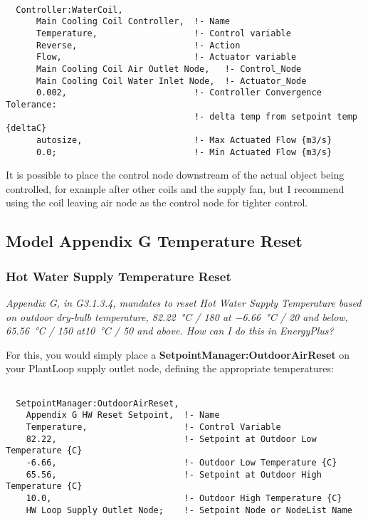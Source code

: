 \begin{lstlisting}

  Controller:WaterCoil,
      Main Cooling Coil Controller,  !- Name
      Temperature,                   !- Control variable
      Reverse,                       !- Action
      Flow,                          !- Actuator variable
      Main Cooling Coil Air Outlet Node,   !- Control_Node
      Main Cooling Coil Water Inlet Node,  !- Actuator_Node
      0.002,                         !- Controller Convergence Tolerance:
                                     !- delta temp from setpoint temp {deltaC}
      autosize,                      !- Max Actuated Flow {m3/s}
      0.0;                           !- Min Actuated Flow {m3/s}
\end{lstlisting}

It is possible to place the control node downstream of the actual object being controlled, for example after other coils and the supply fan, but I recommend using the coil leaving air node as the control node for tighter control.



\subsection{Model Appendix G Temperature Reset}%
\label{sub:model_appendix_g_temperature_reset}

\subsubsection{Hot Water Supply Temperature Reset}%
\label{ssub:hot_water_supply_temperature_reset}

\emph{Appendix G, in G3.1.3.4, mandates to reset Hot Water Supply Temperature based on outdoor dry-bulb temperature, \SI{82.22}{\celsius} / \SI{180}{\farenheit} at \SI{-6.66}{\celsius} / \SI{20}{\farenheit} and below, \SI{65.56}{\celsius} / \SI{150}{\farenheit} at\SI{10}{\celsius} / \SI{50}{\farenheit} and above. How can I do this in EnergyPlus?}

For this, you would simply place a \textbf{SetpointManager:OutdoorAirReset} on your PlantLoop supply outlet node, defining the appropriate temperatures:

\begin{lstlisting}

  SetpointManager:OutdoorAirReset,
    Appendix G HW Reset Setpoint,  !- Name
    Temperature,                   !- Control Variable
    82.22,                         !- Setpoint at Outdoor Low Temperature {C}
    -6.66,                         !- Outdoor Low Temperature {C}
    65.56,                         !- Setpoint at Outdoor High Temperature {C}
    10.0,                          !- Outdoor High Temperature {C}
    HW Loop Supply Outlet Node;    !- Setpoint Node or NodeList Name

\end{lstlisting}


